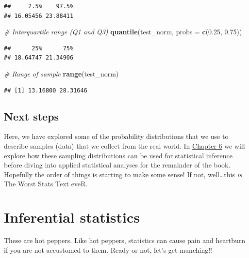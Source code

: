 \documentclass[
]{book}
\newenvironment{Shaded}{\begin{snugshade}}{\end{snugshade}}
\newcommand{\CommentTok}[1]{\textcolor[rgb]{0.56,0.35,0.01}{\textit{#1}}}
\newcommand{\DataTypeTok}[1]{\textcolor[rgb]{0.13,0.29,0.53}{#1}}
\newcommand{\FloatTok}[1]{\textcolor[rgb]{0.00,0.00,0.81}{#1}}
\newcommand{\KeywordTok}[1]{\textcolor[rgb]{0.13,0.29,0.53}{\textbf{#1}}}
\newcommand{\NormalTok}[1]{#1}
\begin{document}
\begin{verbatim}
##     2.5%    97.5% 
## 16.05456 23.88411
\end{verbatim}

\begin{Shaded}
\begin{Highlighting}[]
\CommentTok{# Interquartile range (Q1 and Q3)}
\KeywordTok{quantile}\NormalTok{(test_norm, }\DataTypeTok{probs =} \KeywordTok{c}\NormalTok{(}\FloatTok{0.25}\NormalTok{, }\FloatTok{0.75}\NormalTok{))    }
\end{Highlighting}
\end{Shaded}

\begin{verbatim}
##      25%      75% 
## 18.64747 21.34906
\end{verbatim}

\begin{Shaded}
\begin{Highlighting}[]
\CommentTok{# Range of sample}
\KeywordTok{range}\NormalTok{(test_norm)                             }
\end{Highlighting}
\end{Shaded}

\begin{verbatim}
## [1] 13.16800 28.31646
\end{verbatim}

\hypertarget{next5}{%
\section{Next steps}\label{next5}}

Here, we have explored some of the probability distributions that we use to describe samples (data) that we collect from the real world. In \protect\hyperlink{Chapter6}{Chapter 6} we will explore how these sampling distributions can be used for statistical inference before diving into applied statistical analyses for the remainder of the book. Hopefully the order of things is starting to make some sense! If not, well\ldots this \emph{is} The Worst Stats Text eveR.

\hypertarget{Chapter6}{%
\chapter{Inferential statistics}\label{Chapter6}}

These are hot peppers. Like hot peppers, statistics can cause pain and heartburn if you are not accustomed to them. Ready or not, let's get munching!!
\end{document}
